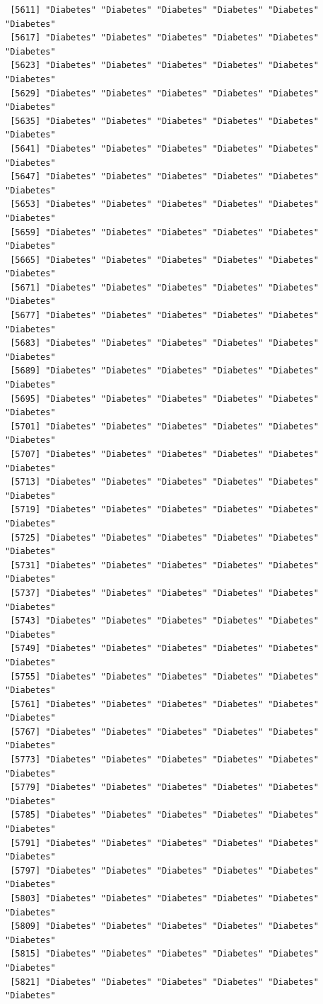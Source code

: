 \documentclass[
  letterpaper,
  DIV=11,
  numbers=noendperiod]{scrartcl}
\begin{document}
\begin{verbatim}
 [5611] "Diabetes" "Diabetes" "Diabetes" "Diabetes" "Diabetes" "Diabetes"
 [5617] "Diabetes" "Diabetes" "Diabetes" "Diabetes" "Diabetes" "Diabetes"
 [5623] "Diabetes" "Diabetes" "Diabetes" "Diabetes" "Diabetes" "Diabetes"
 [5629] "Diabetes" "Diabetes" "Diabetes" "Diabetes" "Diabetes" "Diabetes"
 [5635] "Diabetes" "Diabetes" "Diabetes" "Diabetes" "Diabetes" "Diabetes"
 [5641] "Diabetes" "Diabetes" "Diabetes" "Diabetes" "Diabetes" "Diabetes"
 [5647] "Diabetes" "Diabetes" "Diabetes" "Diabetes" "Diabetes" "Diabetes"
 [5653] "Diabetes" "Diabetes" "Diabetes" "Diabetes" "Diabetes" "Diabetes"
 [5659] "Diabetes" "Diabetes" "Diabetes" "Diabetes" "Diabetes" "Diabetes"
 [5665] "Diabetes" "Diabetes" "Diabetes" "Diabetes" "Diabetes" "Diabetes"
 [5671] "Diabetes" "Diabetes" "Diabetes" "Diabetes" "Diabetes" "Diabetes"
 [5677] "Diabetes" "Diabetes" "Diabetes" "Diabetes" "Diabetes" "Diabetes"
 [5683] "Diabetes" "Diabetes" "Diabetes" "Diabetes" "Diabetes" "Diabetes"
 [5689] "Diabetes" "Diabetes" "Diabetes" "Diabetes" "Diabetes" "Diabetes"
 [5695] "Diabetes" "Diabetes" "Diabetes" "Diabetes" "Diabetes" "Diabetes"
 [5701] "Diabetes" "Diabetes" "Diabetes" "Diabetes" "Diabetes" "Diabetes"
 [5707] "Diabetes" "Diabetes" "Diabetes" "Diabetes" "Diabetes" "Diabetes"
 [5713] "Diabetes" "Diabetes" "Diabetes" "Diabetes" "Diabetes" "Diabetes"
 [5719] "Diabetes" "Diabetes" "Diabetes" "Diabetes" "Diabetes" "Diabetes"
 [5725] "Diabetes" "Diabetes" "Diabetes" "Diabetes" "Diabetes" "Diabetes"
 [5731] "Diabetes" "Diabetes" "Diabetes" "Diabetes" "Diabetes" "Diabetes"
 [5737] "Diabetes" "Diabetes" "Diabetes" "Diabetes" "Diabetes" "Diabetes"
 [5743] "Diabetes" "Diabetes" "Diabetes" "Diabetes" "Diabetes" "Diabetes"
 [5749] "Diabetes" "Diabetes" "Diabetes" "Diabetes" "Diabetes" "Diabetes"
 [5755] "Diabetes" "Diabetes" "Diabetes" "Diabetes" "Diabetes" "Diabetes"
 [5761] "Diabetes" "Diabetes" "Diabetes" "Diabetes" "Diabetes" "Diabetes"
 [5767] "Diabetes" "Diabetes" "Diabetes" "Diabetes" "Diabetes" "Diabetes"
 [5773] "Diabetes" "Diabetes" "Diabetes" "Diabetes" "Diabetes" "Diabetes"
 [5779] "Diabetes" "Diabetes" "Diabetes" "Diabetes" "Diabetes" "Diabetes"
 [5785] "Diabetes" "Diabetes" "Diabetes" "Diabetes" "Diabetes" "Diabetes"
 [5791] "Diabetes" "Diabetes" "Diabetes" "Diabetes" "Diabetes" "Diabetes"
 [5797] "Diabetes" "Diabetes" "Diabetes" "Diabetes" "Diabetes" "Diabetes"
 [5803] "Diabetes" "Diabetes" "Diabetes" "Diabetes" "Diabetes" "Diabetes"
 [5809] "Diabetes" "Diabetes" "Diabetes" "Diabetes" "Diabetes" "Diabetes"
 [5815] "Diabetes" "Diabetes" "Diabetes" "Diabetes" "Diabetes" "Diabetes"
 [5821] "Diabetes" "Diabetes" "Diabetes" "Diabetes" "Diabetes" "Diabetes"

\end{verbatim}
\end{document}

